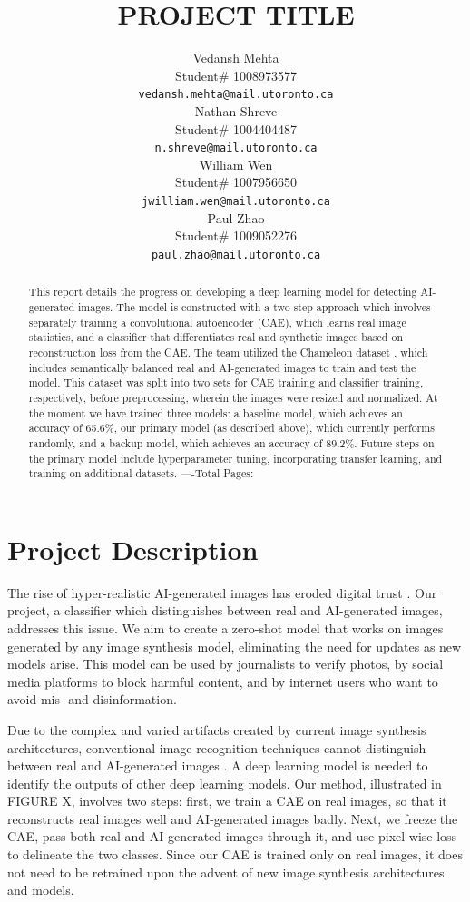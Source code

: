 \documentclass{article} %
\title{PROJECT TITLE}
\author{Vedansh Mehta  \\
Student\# 1008973577 \\
\texttt{vedansh.mehta@mail.utoronto.ca} \\
\And
Nathan Shreve  \\
Student\# 1004404487 \\
\texttt{n.shreve@mail.utoronto.ca} \\
\AND
William Wen  \\
Student\# 1007956650 \\
\texttt{jwilliam.wen@mail.utoronto.ca} \\
\And
Paul Zhao \\
Student\# 1009052276 \\
\texttt{paul.zhao@mail.utoronto.ca} \\
\AND
}
\begin{document}
\maketitle

\begin{abstract}
    This report details the progress on developing a deep learning model for detecting AI-generated images. The model is constructed with a two-step approach which involves separately training a convolutional autoencoder (CAE), which learns real image statistics, and a classifier that differentiates real and synthetic images based on reconstruction loss from the CAE. The team utilized the Chameleon dataset \citep{yan2024sanity}, which includes semantically balanced real and AI-generated images to train and test the model. This dataset was split into two sets for CAE training and classifier training, respectively, before preprocessing, wherein the images were resized and normalized. At the moment we have trained three models: a baseline model, which achieves an accuracy of 65.6\%, our primary model (as described above), which currently performs randomly, and a backup model, which achieves an accuracy of 89.2\%. Future steps on the primary model include hyperparameter tuning, incorporating transfer learning, and training on additional datasets.
    ----Total Pages: \pageref{last_page}
\end{abstract}



\section{Project Description}
\label{project_description}

The rise of hyper-realistic AI-generated images has eroded digital trust \citep{digitalcontent2024trust}. Our project, a classifier which distinguishes between real and AI-generated images, addresses this issue. We aim to create a zero-shot model that works on images generated by any image synthesis model, eliminating the need for updates as new models arise. This model can be used by journalists to verify photos, by social media platforms to block harmful content, and by internet users who want to avoid mis- and disinformation.


Due to the complex and varied artifacts created by current image synthesis architectures, conventional image recognition techniques cannot distinguish between real and AI-generated images \citep{ledig2017}. A deep learning model is needed to identify the outputs of other deep learning models. Our method, illustrated in FIGURE X, involves two steps: first, we train a CAE on real images, so that it reconstructs real images well and AI-generated images badly. Next, we freeze the CAE, pass both real and AI-generated images through it, and use pixel-wise loss to delineate the two classes. Since our CAE is trained only on real images, it does not need to be retrained upon the advent of new image synthesis architectures and models.
\end{document}
